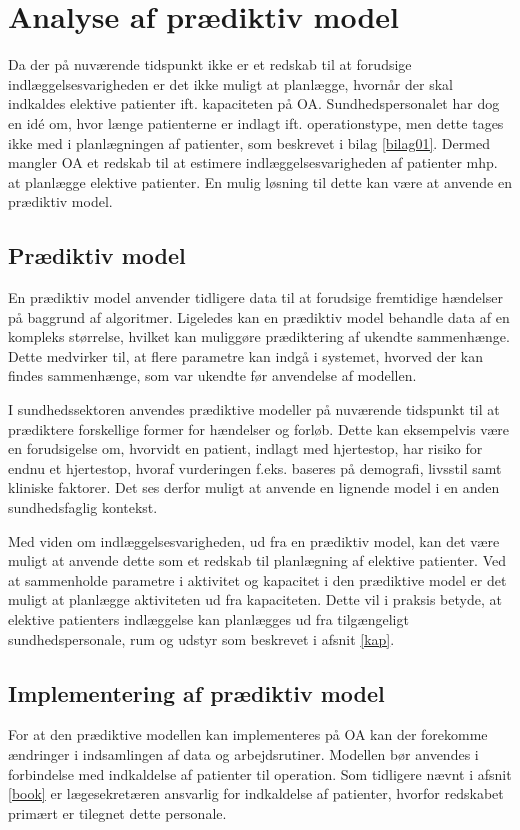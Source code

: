 \chapter{Analyse af prædiktiv model}
Da der på nuværende tidspunkt ikke er et redskab til at forudsige indlæggelsesvarigheden er det ikke muligt at planlægge, hvornår der skal indkaldes elektive patienter ift. kapaciteten på OA. Sundhedspersonalet har dog en idé om, hvor længe patienterne er indlagt ift. operationstype, men dette tages ikke med i planlægningen af patienter, som beskrevet i bilag \ref{bilag01}. Dermed mangler OA et redskab til at estimere indlæggelsesvarigheden af patienter mhp. at planlægge elektive patienter. En mulig løsning til dette kan være at anvende en prædiktiv model. 


\section{Prædiktiv model} \label{praemodel}
En prædiktiv model anvender tidligere data til at forudsige fremtidige hændelser på baggrund af algoritmer. Ligeledes kan en prædiktiv model behandle data af en kompleks størrelse, hvilket kan muliggøre prædiktering af ukendte sammenhænge. Dette medvirker til, at flere parametre kan indgå i systemet, hvorved der kan findes sammenhænge, som var ukendte før anvendelse af modellen.\cite{Kuhn2013}


I sundhedssektoren anvendes prædiktive modeller på nuværende tidspunkt til at prædiktere forskellige former for hændelser og forløb. Dette kan eksempelvis være en forudsigelse om, hvorvidt en patient, indlagt med hjertestop, har risiko for endnu et hjertestop, hvoraf vurderingen f.eks. baseres på demografi, livsstil samt kliniske faktorer\cite{Hastie2008}. Det ses derfor muligt at anvende en lignende model i en anden sundhedsfaglig kontekst.


Med viden om indlæggelsesvarigheden, ud fra en prædiktiv model, kan det være muligt at anvende dette som et redskab til planlægning af elektive patienter. Ved at sammenholde parametre i aktivitet og kapacitet i den prædiktive model er det muligt at planlægge aktiviteten ud fra kapaciteten. Dette vil i praksis betyde, at elektive patienters indlæggelse kan planlægges ud fra tilgængeligt sundhedspersonale, rum og udstyr som beskrevet i afsnit \ref{kap}. 


\section{Implementering af prædiktiv model}
For at den prædiktive modellen kan implementeres på OA kan der forekomme ændringer i indsamlingen af data og arbejdsrutiner.  Modellen bør anvendes i forbindelse med indkaldelse af patienter til operation. Som tidligere nævnt i afsnit \ref{book} er lægesekretæren ansvarlig for indkaldelse af patienter, hvorfor redskabet primært er tilegnet dette personale. 



